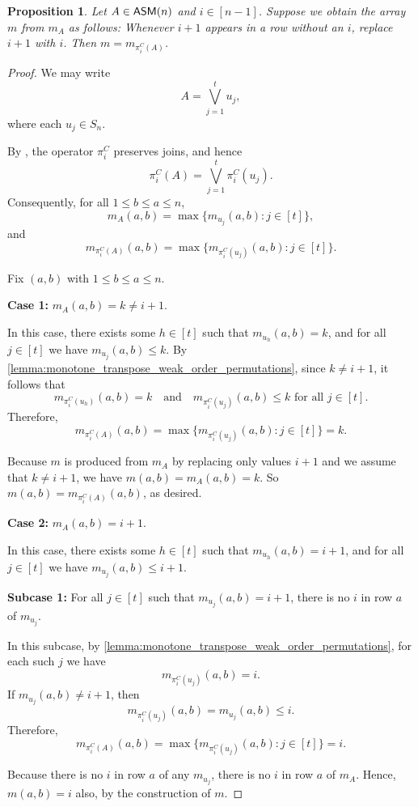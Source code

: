 \documentclass[12 pt]{amsart}
\newtheorem{proposition}[Theorem]{Proposition}
\numberwithin{equation}{section}
\theoremstyle{remark}
\newcommand{\asm}{{\sf ASM}}
\begin{document}
\begin{proposition}
\label{prop:monotone_transpose_weak_order}
Let $A\in \asm(n)$ and $i\in[n-1]$.  Suppose we obtain the array $m$ from $m_A$ as follows: Whenever $i+1$ appears in a row without an $i$, replace $i+1$ with $i$.  Then $m=m_{\pi_i^C(A)}$.
\end{proposition}

\begin{proof}
We may write
\[
A = \bigvee_{j=1}^t u_j,
\]
where each $u_j \in S_n$. 

By \cite[Proposition 3.4]{EKW-main}, the operator $\pi_i^C$ preserves joins, and hence
\[
\pi_i^C(A) = \bigvee_{j=1}^t \pi_i^C(u_j).
\]
Consequently, for all $1 \le b \le a \le n$,
\[
m_A(a,b) = \max\{ m_{u_j}(a,b) : j \in [t] \},\]
and
\[m_{\pi_i^C(A)}(a,b)
= \max\{ m_{\pi_i^C(u_j)}(a,b) : j \in [t] \}.
\]



Fix $(a,b)$ with $1 \le b \le a \le n$.

\noindent\textbf{Case 1:} $m_A(a,b) = k \neq i+1$.

In this case, there exists some $h \in [t]$ such that $m_{u_h}(a,b) = k$, and for all $j \in [t]$ we have
$m_{u_j}(a,b) \le k$.
By \cref{lemma:monotone_transpose_weak_order_permutations}, since $k \neq i+1$, it follows that
\[
m_{\pi_i^C(u_h)}(a,b) = k
\quad\text{and}\quad
m_{\pi_i^C(u_j)}(a,b) \le k
\text{ for all } j \in [t].
\]
Therefore,
\[
m_{\pi_i^C(A)}(a,b)
= \max\{ m_{\pi_i^C(u_j)}(a,b) : j \in [t] \}
= k.
\]

Because $m$ is produced from $m_A$ by replacing only values $i+1$ and we assume that $k \neq i+1$, we have $m(a,b) = m_A(a,b) = k$. So $m(a,b) = m_{\pi_i^C(A)}(a,b)$, as desired.

\noindent\textbf{Case 2:} $m_A(a,b) = i+1$.

In this case, there exists some $h \in [t]$ such that $m_{u_h}(a,b) = i+1$, and for all $j \in [t]$ we have
$m_{u_j}(a,b) \le i+1$.

\noindent\textbf{Subcase 1:}
For all $j \in [t]$ such that $m_{u_j}(a,b) = i+1$, there is no $i$ in row $a$ of $m_{u_j}$.

In this subcase, by \cref{lemma:monotone_transpose_weak_order_permutations}, for each such $j$ we have
\[
m_{\pi_i^C(u_j)}(a,b) = i.
\]
If $m_{u_j}(a,b) \neq i+1$, then
\[
m_{\pi_i^C(u_j)}(a,b)
= m_{u_j}(a,b)
\le i.
\]
Therefore,
\[
m_{\pi_i^C(A)}(a,b)
= \max\{ m_{\pi_i^C(u_j)}(a,b) : j \in [t] \}
= i.
\]

Because there is no $i$ in row $a$ of any $m_{u_j}$, there is no $i$ in row $a$ of $m_A$. Hence, $m(a,b) = i$ also, by the construction of $m$.


\end{proof}
\end{document}
